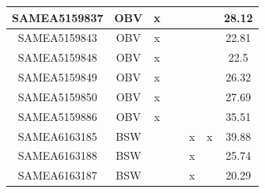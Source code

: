 \documentclass[../main.tex]{subfiles}
\begin{document}
\begin{flushleft}
\begin{footnotesize}
\begin{longtable}{|c|c|c|c|c|c|c|}
    \hline
    SAMEA5159837  & OBV   & x                                                            & ~          & ~                                                                           & ~                                                                 & 28.12     \\ 
    \hline
    SAMEA5159843  & OBV   & x                                                            & ~          & ~                                                                           & ~                                                                 & 22.81     \\ 
    \hline
    SAMEA5159848  & OBV   & x                                                            & ~          & ~                                                                           & ~                                                                 & 22.5      \\ 
    \hline
    SAMEA5159849  & OBV   & x                                                            & ~          & ~                                                                           & ~                                                                 & 26.32     \\ 
    \hline
    SAMEA5159850  & OBV   & x                                                            & ~          & ~                                                                           & ~                                                                 & 27.69     \\ 
    \hline
    SAMEA5159886  & OBV   & x                                                            & ~          & ~                                                                           & ~                                                                 & 35.51     \\ 
    \hline
    SAMEA6163185  & BSW   & ~                                                            & ~          & x                                                                           & x                                                                 & 39.88     \\ 
    \hline
    SAMEA6163188  & BSW   & ~                                                            & ~          & x                                                                           & ~                                                                 & 25.74     \\ 
    \hline
    SAMEA6163187  & BSW   & ~                                                            & ~          & x                                                                           & ~                                                                 & 20.29     \\ 

\end{longtable}
\end{footnotesize}
\end{flushleft}
\end{document}

